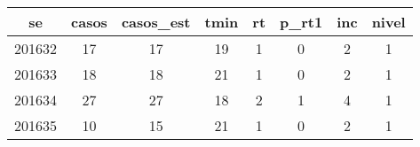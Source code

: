 \begin{tabular}{c|ccccccc}
  \hline
se & casos & casos\_est & tmin & rt & p\_rt1 & inc & nivel \\ 
  \hline
201632 & 17 & 17 & 19 & 1 & 0 & 2 & 1 \\ 
  201633 & 18 & 18 & 21 & 1 & 0 & 2 & 1 \\ 
  201634 & 27 & 27 & 18 & 2 & 1 & 4 & 1 \\ 
  201635 & 10 & 15 & 21 & 1 & 0 & 2 & 1 \\ 
   \hline
\end{tabular}

